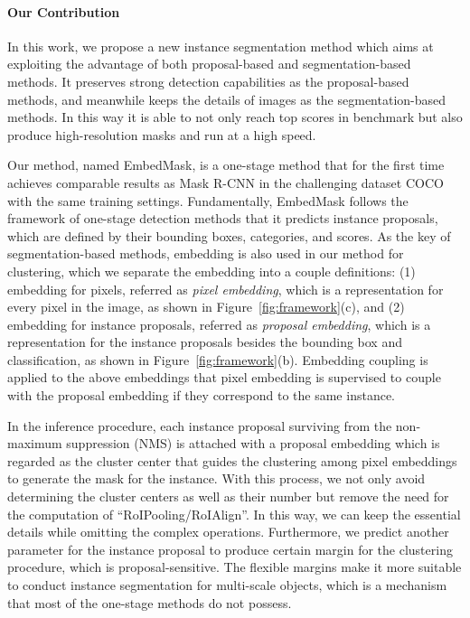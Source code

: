 \documentclass[10pt,twocolumn,letterpaper]{article}
\begin{document}
\paragraph{Our Contribution} In this work, we propose a new instance segmentation method which aims at exploiting the advantage of both proposal-based and segmentation-based methods. 
It preserves strong detection capabilities as the proposal-based methods, and meanwhile keeps the details of images as the segmentation-based methods.
In this way it is able to not only reach top scores in benchmark but also produce high-resolution masks and run at a high speed. 

Our method, named EmbedMask, is a one-stage method that for the first time achieves comparable results as Mask R-CNN in the challenging dataset COCO with the same training settings. 
Fundamentally, EmbedMask follows the framework of one-stage detection methods that it predicts instance proposals, which are defined by their bounding boxes, categories, and scores. 
As the key of segmentation-based methods, embedding is also used in our method for clustering, which we separate the embedding into a couple definitions: (1) embedding for pixels, referred as \emph{pixel embedding}, which is a representation for every pixel in the image, as shown in Figure~\ref{fig:framework}(c), and (2) embedding for instance proposals, referred as \emph{proposal embedding}, which is a representation for the instance proposals besides the bounding box and classification, as shown in Figure~\ref{fig:framework}(b). 
Embedding coupling is applied to the above embeddings that pixel embedding is supervised to couple with the proposal embedding if they correspond to the same instance.

In the inference procedure, each instance proposal surviving from the non-maximum suppression (NMS) is attached with a proposal embedding which is regarded as the cluster center that guides the clustering among pixel embeddings to generate the mask for the instance. 
With this process, we not only avoid determining the cluster centers as well as their number but remove the need for the computation of ``RoIPooling/RoIAlign''. 
In this way, we can keep the essential details while omitting the complex operations.
Furthermore, we predict another parameter for the instance proposal to produce certain margin for the clustering procedure, which is proposal-sensitive. 
The flexible margins make it more suitable to conduct instance segmentation for multi-scale objects, which is a mechanism that most of the one-stage methods do not possess.
\end{document}
